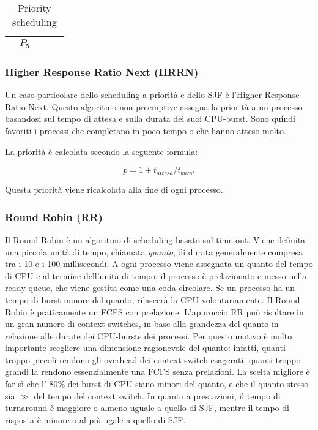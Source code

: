 \documentclass[a4]{article}
\begin{document}
\begin{table}[h]
\begin{tabular}{|c|ccccc|cccccccccc|ccc|c|}
                                                             & \multicolumn{5}{c|}{\cellcolor[HTML]{656565}$P_5$} & \multicolumn{10}{c|}{}                              & \multicolumn{3}{c|}{}                              &                                                                                                     \\ \hline
    \end{tabular}
    \caption{Priority scheduling}
\end{table}


\subsubsection{Higher Response Ratio Next (HRRN)}
Un caso particolare dello scheduling a priorità e dello SJF è l'Higher Response Ratio Next. Questo algoritmo non-preemptive assegna la priorità a un processo basandosi sul tempo di attesa e sulla durata dei suoi CPU-burst. Sono quindi favoriti i processi che completano in poco tempo o che hanno atteso molto.

La priorità è calcolata secondo la seguente formula:

$$
    p = 1 + t_{attesa}/t_{burst}
$$

Questa priorità viene ricalcolata alla fine di ogni processo.

\subsubsection{Round Robin (RR)}
Il Round Robin è un algoritmo di scheduling basato sul time-out. Viene definita una piccola unità di tempo, chiamata \textit{quanto}, di durata generalmente compresa tra i 10 e i 100 millisecondi. A ogni processo viene assegnata un quanto del tempo di CPU e al termine dell'unità di tempo, il processo è prelazionato e messo nella ready queue, che viene gestita come una coda circolare. Se un processo ha un tempo di burst minore del quanto, rilascerà la CPU volontariamente. Il Round Robin è praticamente un FCFS con prelazione.
L'approccio RR può risultare in un gran numero di context switches, in base alla grandezza del quanto in relazione alle durate dei CPU-bursts dei processi. Per questo motivo è molto importante scegliere una dimensione ragionevole del quanto: infatti, quanti troppo piccoli rendono gli overhead dei context switch esagerati, quanti troppo grandi la rendono essenzialmente una FCFS senza prelazioni. La scelta migliore è far sì che l' 80\% dei burst di CPU siano minori del quanto, e che il quanto stesso sia $\gg$ del tempo del context switch.\newline
In quanto a prestazioni, il tempo di turnaround è maggiore o almeno uguale a quello di SJF, mentre il tempo di risposta è minore o al più ugale a quello di SJF.
\end{document}
